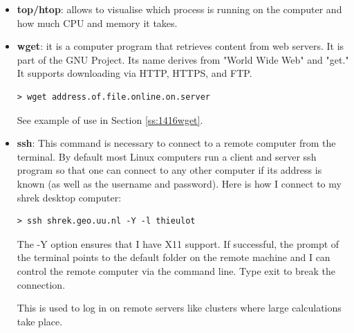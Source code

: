 \begin{itemize}
\item {\color{teal} \bf top/htop}: allows to visualise which process is running on the computer and how much CPU and memory it takes.




\item {\color{teal} \bf wget}: it is a computer program that retrieves content from web servers. 
It is part of the GNU Project. Its name derives from "World Wide Web" and "get." 
It supports downloading via HTTP, HTTPS, and FTP.  
\begin{mdframed}[backgroundcolor=gray!10]
\begin{verbatim}
> wget address.of.file.online.on.server
\end{verbatim}
\end{mdframed}
See example of use in Section \ref{ss:1416wget}.


\item {\color{teal} \bf ssh}:  This command is necessary to connect to a remote computer from the terminal. 
By default most Linux computers run a client and server ssh program so that one can connect to 
any other computer if its address is known (as well as the username and password).
Here is how I connect to my shrek desktop computer:
\begin{mdframed}[backgroundcolor=gray!10]
\begin{verbatim}
> ssh shrek.geo.uu.nl -Y -l thieulot
\end{verbatim}
\end{mdframed}
The -Y option ensures that I have X11 support. If successful, the prompt of the terminal points
to the default folder on the remote machine and I can control the remote computer via the command line. 
Type exit to break the connection.

This is used to log in on remote servers like clusters where large calculations take place. 
 


\end{itemize}
